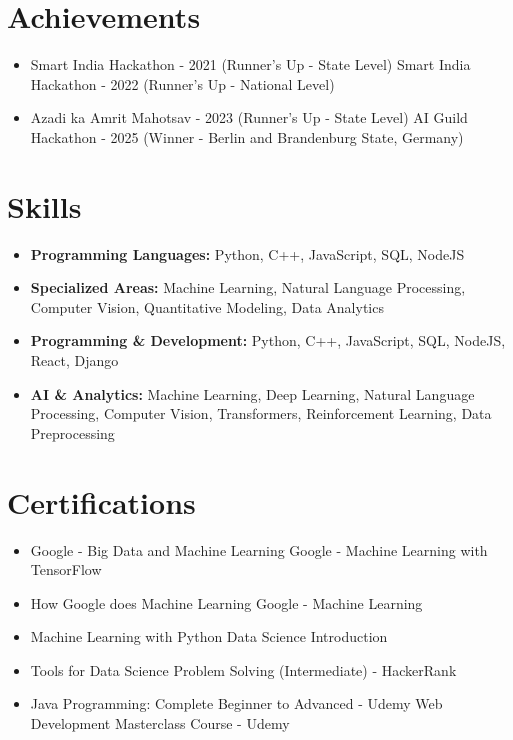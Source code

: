 \documentclass[a4paper,10pt]{article}
\begin{document}
\section*{Achievements}
\begin{itemize}
\item Smart India Hackathon - 2021 (Runner's Up - State Level) \hfill Smart India Hackathon - 2022 (Runner's Up - National Level)
\item Azadi ka Amrit Mahotsav - 2023 (Runner's Up - State Level) \hfill AI Guild Hackathon - 2025 (Winner - Berlin and Brandenburg State, Germany)
\end{itemize}

\section*{Skills}
\begin{itemize}
  \item \textbf{Programming Languages:} Python, C++, JavaScript, SQL, NodeJS
  \item \textbf{Specialized Areas:} Machine Learning, Natural Language Processing, Computer Vision, Quantitative Modeling, Data Analytics
  \item \textbf{Programming \& Development:} Python, C++, JavaScript, SQL, NodeJS, React, Django
  \item \textbf{AI \& Analytics:} Machine Learning, Deep Learning, Natural Language Processing, Computer Vision, Transformers, Reinforcement Learning, Data Preprocessing
\end{itemize}

\section*{Certifications}
\begin{itemize}
\item Google - Big Data and Machine Learning \hfill Google - Machine Learning with TensorFlow
\item How Google does Machine Learning \hfill Google - Machine Learning
\item Machine Learning with Python \hfill Data Science Introduction
\item Tools for Data Science \hfill Problem Solving (Intermediate) - HackerRank
\item Java Programming: Complete Beginner to Advanced - Udemy \hfill Web Development Masterclass Course - Udemy
\end{itemize}
\end{document}
